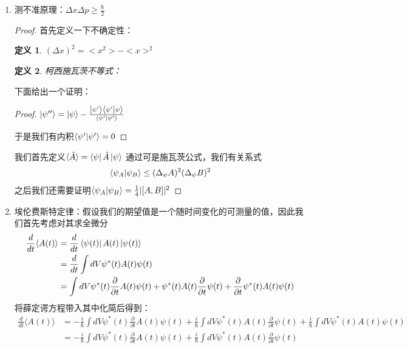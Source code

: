 \documentclass{article}
\newtheorem{definition}{定义}
\begin{document}
\begin{enumerate}
	\item 测不准原理：$\Delta x\Delta p\geqslant  \frac{\hbar}{2}$
	      \begin{proof}
		      首先定义一下不确定性：
		      \begin{definition}
			      $(\Delta x)^2=<x^2>-<x>^2$
		      \end{definition}
		      \begin{definition}
			      柯西施瓦茨不等式：
			      \[\]
		      \end{definition}
		      下面给出一个证明：
		      \begin{proof}
			      $\ket{\psi^{\prime\prime}}=\ket{\psi}-\frac{\ket{\psi^\prime}\braket{\psi^\prime}{\psi}}{\braket{\psi^\prime}{\psi^\prime}}$

			      于是我们有内积$\braket{\psi^\prime}{\psi^{\prime}}=0$
		      \end{proof}
		      我们首先定义$\langle\hat{A}\rangle=\bra{\psi}\hat{A}\ket{\psi}$
		      通过可是施瓦茨公式，我们有关系式
		      \[\braket{\psi_A}{\psi_B}\leq(\Delta_\psi A)^2(\Delta_\psi B)^2\]
		      之后我们还需要证明$\braket{\psi_A}{\psi_B}=\frac{1}{4}|[A,B]|^2$
	      \end{proof}
	\item 埃伦费斯特定律：假设我们的期望值是一个随时间变化的可测量的值，因此我们首先考虑对其求全微分
	      \begin{align*}
		      \frac{d}{dt}\langle A(t)\rangle & =\frac{d}{dt}\bra{\psi(t)}A(t)\ket{\psi(t)}                                                                                                                 \\
		                                      & =\frac{d}{dt}\int dV \psi^*(t)A(t)\psi(t)                                                                                                                   \\
		                                      & =\int dV\psi^*(t)\frac{\partial}{\partial t}A(t)\psi(t) + \psi^*(t)A(t)\frac{\partial}{\partial t}\psi(t) + \frac{\partial}{\partial t}\psi^*(t)A(t)\psi(t)
	      \end{align*}
	      将薛定谔方程带入其中化简后得到：
	      \begin{align*}
		      \frac{d}{dt}\langle A(t)\rangle & =-\frac{i}{\hbar}\int dV\psi^*(t)\frac{\partial}{\partial t}A(t)\psi(t) + \frac{i}{\hbar}\int dV\psi^*(t)A(t)\frac{\partial}{\partial t}\psi(t) + \frac{i}{\hbar}\int dV\psi^*(t)A(t)\psi(t) \\
		                                      & =-\frac{i}{\hbar}\int dV\psi^*(t)\frac{\partial}{\partial t}A(t)\psi(t) + \frac{i}{\hbar}\int dV\psi^*(t)A(t)\frac{\partial}{\partial t}\psi(t)                                              \\

\end{align*}
\end{enumerate}
\end{document}
